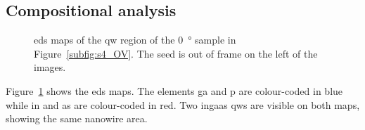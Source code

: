 \subsection{Compositional analysis}

\begin{figure}
    \centering
    \caption{\acs{eds} maps of the \acl{qw} region of the \qty{0}{\degree} sample in Figure~\ref{subfig:s4_OV}. The seed is out of frame on the left of the images.}
    \label{fig:s4_0deg_EDS_maps_wells}
\end{figure}

Figure~\ref{fig:s4_0deg_EDS_maps_wells} shows the \acs{eds} maps. The elements \acl{ga} and \acl{p} are colour-coded in blue while \acl{in} and \acl{as} are colour-coded in red. Two \acs{ingaas} \acl{qw}s are visible on both maps, showing the same nanowire area. 

